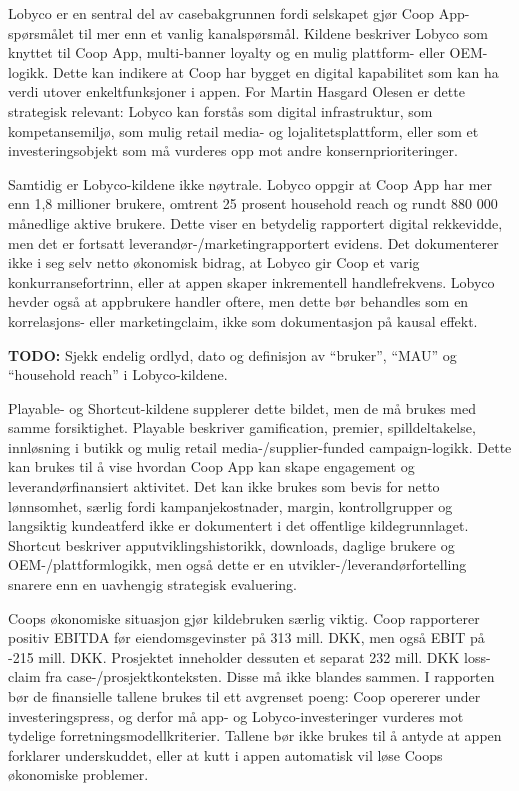 \documentclass[12pt,a4paper]{article}
\newcommand{\todo}[1]{\par\noindent\textcolor{red!70!black}{\textbf{TODO:} #1}\par}
\begin{document}
Lobyco er en sentral del av casebakgrunnen fordi selskapet gjør Coop App-spørsmålet til mer enn et vanlig kanalspørsmål. Kildene beskriver Lobyco som knyttet til Coop App, multi-banner loyalty og en mulig plattform- eller OEM-logikk. Dette kan indikere at Coop har bygget en digital kapabilitet som kan ha verdi utover enkeltfunksjoner i appen. For Martin Hasgard Olesen er dette strategisk relevant: Lobyco kan forstås som digital infrastruktur, som kompetansemiljø, som mulig retail media- og lojalitetsplattform, eller som et investeringsobjekt som må vurderes opp mot andre konsernprioriteringer.

Samtidig er Lobyco-kildene ikke nøytrale. Lobyco oppgir at Coop App har mer enn 1,8 millioner brukere, omtrent 25 prosent household reach og rundt 880 000 månedlige aktive brukere. Dette viser en betydelig rapportert digital rekkevidde, men det er fortsatt leverandør-/marketingrapportert evidens. Det dokumenterer ikke i seg selv netto økonomisk bidrag, at Lobyco gir Coop et varig konkurransefortrinn, eller at appen skaper inkrementell handlefrekvens. Lobyco hevder også at appbrukere handler oftere, men dette bør behandles som en korrelasjons- eller marketingclaim, ikke som dokumentasjon på kausal effekt. \todo{Sjekk endelig ordlyd, dato og definisjon av ``bruker'', ``MAU'' og ``household reach'' i Lobyco-kildene.}

Playable- og Shortcut-kildene supplerer dette bildet, men de må brukes med samme forsiktighet. Playable beskriver gamification, premier, spilldeltakelse, innløsning i butikk og mulig retail media-/supplier-funded campaign-logikk. Dette kan brukes til å vise hvordan Coop App kan skape engagement og leverandørfinansiert aktivitet. Det kan ikke brukes som bevis for netto lønnsomhet, særlig fordi kampanjekostnader, margin, kontrollgrupper og langsiktig kundeatferd ikke er dokumentert i det offentlige kildegrunnlaget. Shortcut beskriver apputviklingshistorikk, downloads, daglige brukere og OEM-/plattformlogikk, men også dette er en utvikler-/leverandørfortelling snarere enn en uavhengig strategisk evaluering.

Coops økonomiske situasjon gjør kildebruken særlig viktig. Coop rapporterer positiv EBITDA før eiendomsgevinster på 313 mill. DKK, men også EBIT på -215 mill. DKK. Prosjektet inneholder dessuten et separat 232 mill. DKK loss-claim fra case-/prosjektkonteksten. Disse må ikke blandes sammen. I rapporten bør de finansielle tallene brukes til ett avgrenset poeng: Coop opererer under investeringspress, og derfor må app- og Lobyco-investeringer vurderes mot tydelige forretningsmodellkriterier. Tallene bør ikke brukes til å antyde at appen forklarer underskuddet, eller at kutt i appen automatisk vil løse Coops økonomiske problemer.
\end{document}
